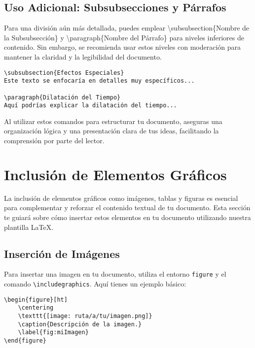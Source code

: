 \documentclass[11pt]{article}
\begin{document}
\subsection{Uso Adicional: Subsubsecciones y Párrafos}

Para una división aún más detallada, puedes emplear \textbackslash subsubsection\{Nombre de la Subsubsección\} y \textbackslash paragraph\{Nombre del Párrafo\} para niveles inferiores de contenido. Sin embargo, se recomienda usar estos niveles con moderación para mantener la claridad y la legibilidad del documento.

\begin{verbatim}
\subsubsection{Efectos Especiales}
Este texto se enfocaría en detalles muy específicos...

\paragraph{Dilatación del Tiempo}
Aquí podrías explicar la dilatación del tiempo...
\end{verbatim}

Al utilizar estos comandos para estructurar tu documento, aseguras una organización lógica y una presentación clara de tus ideas, facilitando la comprensión por parte del lector.


\section{Inclusión de Elementos Gráficos}

La inclusión de elementos gráficos como imágenes, tablas y figuras es esencial para complementar y reforzar el contenido textual de tu documento. Esta sección te guiará sobre cómo insertar estos elementos en tu documento utilizando nuestra plantilla LaTeX.

\subsection{Inserción de Imágenes}

Para insertar una imagen en tu documento, utiliza el entorno \texttt{figure} y el comando \texttt{\textbackslash includegraphics}. Aquí tienes un ejemplo básico:

\begin{verbatim}
\begin{figure}[ht]
    \centering
    \texttt{[image: ruta/a/tu/imagen.png]}
    \caption{Descripción de la imagen.}
    \label{fig:miImagen}
\end{figure}
\end{verbatim}
\end{document}
